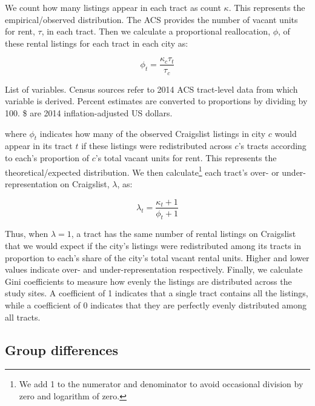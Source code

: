 \documentclass[11pt,letterpaper]{article}
\begin{document}
We count how many listings appear in each tract as count $\kappa$. This represents the empirical/observed distribution. The ACS provides the number of vacant units for rent, $\tau$, in each tract. Then we calculate a proportional reallocation, $\phi$, of these rental listings for each tract in each city as:

\begin{equation}
\label{eq:allocation}
\phi_t = \frac{\kappa_c \tau_t}{\tau_c}
\end{equation}

\begin{table}[htbp]
	\centering
	\small
	\caption{List of variables. Census sources refer to 2014 ACS tract-level data from which variable is derived. Percent estimates are converted to proportions by dividing by 100. \$ are 2014 inflation-adjusted US dollars.}
	\label{tab:variables_list}
	
\end{table}

where $\phi_t$ indicates how many of the observed Craigslist listings in city $c$ would appear in its tract $t$ if these listings were redistributed across $c$'s tracts according to each's proportion of $c$'s total vacant units for rent. This represents the theoretical/expected distribution. We then calculate\footnote{We add 1 to the numerator and denominator to avoid occasional division by zero and logarithm of zero.} each tract's over- or under-representation on Craigslist, $\lambda$, as:

\begin{equation}
\label{eq:representation}
\lambda_t = \frac{\kappa_t + 1}{\phi_t + 1}
\end{equation}

Thus, when $\lambda=1$, a tract has the same number of rental listings on Craigslist that we would expect if the city's listings were redistributed among its tracts in proportion to each's share of the city's total vacant rental units. Higher and lower values indicate over- and under-representation respectively. Finally, we calculate Gini coefficients to measure how evenly the listings are distributed across the study sites. A coefficient of 1 indicates that a single tract contains all the listings, while a coefficient of 0 indicates that they are perfectly evenly distributed among all tracts.



\subsection{Group differences}
\end{document}
